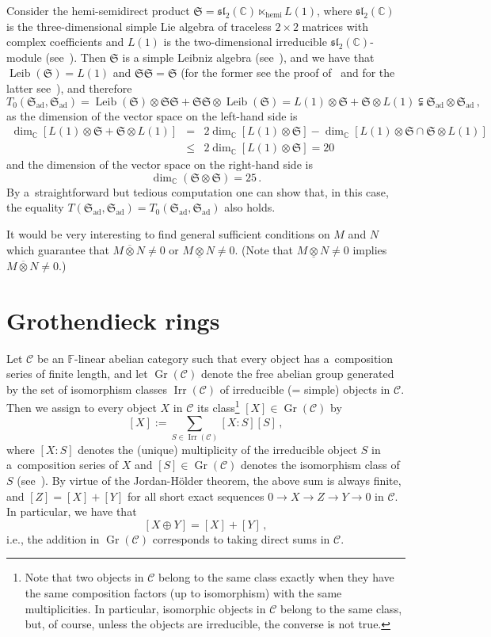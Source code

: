 \documentclass{jonasart}
\DeclareMathOperator{\ad}{ad}
\DeclareMathOperator{\hemi}{hemi}
\DeclareMathOperator{\irr}{Irr}
\DeclareMathOperator{\K}{Gr}
\DeclareMathOperator{\leib}{Leib}
\newcommand{\cbb}{\mathbb{C}}
\newcommand{\ccal}{\mathcal{C}}
\newcommand{\fbb}{\mathbb{F}}
\newcommand{\ovo}{\overline{\otimes}}
\newcommand{\slf}{\mathfrak{sl}}
\newcommand{\ssf}{\mathfrak{S}}
\newcommand{\und}{\underline{\otimes}}
\begin{document}
	\begin{example}
		{Consider the hemi-semidirect product $\ssf=\slf_2 (\cbb)
		\ltimes_{\hemi} L(1)$, where $\slf_2 (\cbb)$ is the three-dimensional simple Lie algebra of traceless $2\times 2$ matrices with complex coefficients and $L(1)$ is the two-dimensional irreducible $\slf_2
		(\cbb)$-module (see~\cite[Example~2.5]{F1}). Then $\ssf$ is a simple Leibniz algebra (see~\cite[Theorem 2.3]{F2}), and we have that $\leib(\ssf)=L(1)$ and $\ssf\ssf=\ssf$ (for the former see the proof of~\cite[Theorem 2.3]{F2} and for the latter see~\cite[Proposition~7.1]{F1}), and therefore}
		\[
			T_0 (\ssf_{\ad},\ssf_{\ad})=\leib(\ssf)\otimes\ssf\ssf+\ssf\ssf
			\otimes\leib(\ssf)=L(1)\otimes\ssf+\ssf\otimes L(1) \subsetneqq
			\ssf_{\ad}\otimes\ssf_{\ad}\,,
		\]
		{as the dimension of the vector space on the left-hand side is}
		\begin{eqnarray*}
			\dim_\cbb[L(1)\otimes\ssf+\ssf\otimes L(1)] & = &
			2\dim_\cbb[L(1)\otimes\ssf]
			-\dim_\cbb[L(1)\otimes\ssf\cap\ssf\otimes L(1)]\\
			& \le & 2\dim_\cbb[L(1)\otimes\ssf]=20
		\end{eqnarray*}
		{and the dimension of the vector space on the right-hand side is}
		\[
			\dim_\cbb(\ssf\otimes\ssf)=25\,.
		\]
		{By a~straightforward but tedious computation one can show that, in this case, the equality $T(\ssf_{\ad},\ssf_{\ad})=T_0 (\ssf_{\ad},\ssf_{\ad})$ also holds.}
	\end{example}
	It would be very interesting to find general sufficient conditions on $M$ and $N$ which guarantee that $M\ovo N\ne 0$ or
	$M\und N\ne 0$. (Note that $M\und N\ne 0$ implies $M\ovo N
	\ne 0$.)

	\section{Grothendieck rings}\label{grothendieck}

	Let $\ccal$ be an $\fbb$-linear abelian category such that every object has a~composition series of finite length, and let $\K(\ccal)$
	denote the free abelian group generated by the set of isomorphism classes $\irr(\ccal)$ of irreducible (= simple) objects in $\ccal$. Then we assign to every object $X$ in $\ccal$ its class\footnote{Note that two objects in $\ccal$ belong to the same class exactly when they have the same composition factors (up to isomorphism) with the same multiplicities. In particular, isomorphic objects in $\ccal$ belong to the same class, but, of course, unless the objects are irreducible, the converse is not true.} $[X]\in\K(\ccal)$ by
	\[
		[X]
		:=\sum_{S\in\irr(\ccal)}[X:S][S]\,,
	\]
	where $[X:S]$ denotes the (unique) multiplicity of the irreducible object $S$ in a~composition series of $X$ and $[S]\in\K(\ccal)$
	denotes the isomorphism class of $S$ (see~\cite[Definition 1.5.8]{EGNO}). By virtue of the Jordan-H\"older theorem, the above sum is always finite, and $[Z]= [X]+[Y]$ for all short exact sequences $0\to X\to Z\to Y\to 0$ in
	$\ccal$. In particular, we have that
	\[
		[X\oplus Y]
		=[X]+[Y]\,,
	\]
	i.e., the addition in $\K(\ccal)$ corresponds to taking direct sums in
	$\ccal$.
\end{document}
